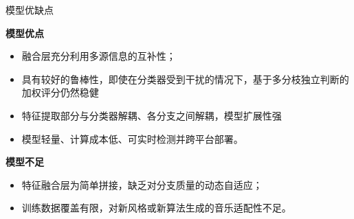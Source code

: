 \documentclass[aspectratio=169]{beamer}
\providecommand{\paragraph}[1]{\smallskip\textbf{#1}\par}
\begin{document}
\begin{frame}{模型优缺点}

\small
\paragraph{模型优点}
\begin{itemize}
  \item 融合层充分利用多源信息的互补性；
  \item 具有较好的鲁棒性，即使在分类器受到干扰的情况下，基于多分枝独立判断的加权评分仍然稳健
  \item 特征提取部分与分类器解耦、各分支之间解耦，模型扩展性强
  \item 模型轻量、计算成本低、可实时检测并跨平台部署。
\end{itemize}

\vspace{0.6em}
\paragraph{模型不足}
\begin{itemize}
  \item 特征融合层为简单拼接，缺乏对分支质量的动态自适应；
  \item 训练数据覆盖有限，对新风格或新算法生成的音乐适配性不足。
\end{itemize}

\end{frame}
\end{document}
